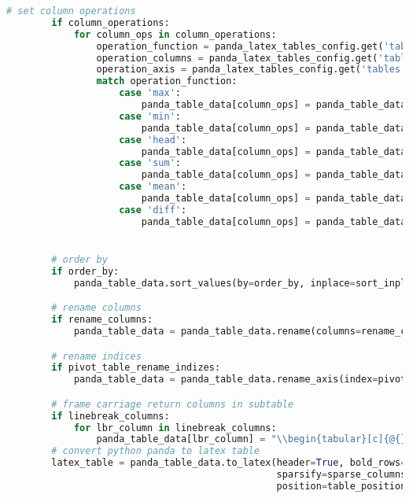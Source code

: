\begin{lstlisting}[language=python, caption=Python LaTex - pandas\_dataframe\_to\_latex\_table.py CSV - LaTex Tabelle,captionpos=b,label={lst:Python LaTex - pandas_dataframe_to_latex_table},breaklines=true]
        # set column operations
        if column_operations:
            for column_ops in column_operations:
                operation_function = panda_latex_tables_config.get('tables').get(table_item).get('column_operations').get('operations').get(column_ops).get('operation_function')
                operation_columns = panda_latex_tables_config.get('tables').get(table_item).get('column_operations').get('operations').get(column_ops).get('columns')
                operation_axis = panda_latex_tables_config.get('tables').get(table_item).get('column_operations').get('operations').get(column_ops).get('axis_number')
                match operation_function:
                    case 'max':
                        panda_table_data[column_ops] = panda_table_data[operation_columns].max()
                    case 'min':
                        panda_table_data[column_ops] = panda_table_data[operation_columns].min()
                    case 'head':
                        panda_table_data[column_ops] = panda_table_data[operation_columns].head()
                    case 'sum':
                        panda_table_data[column_ops] = panda_table_data[operation_columns].sum(axis=operation_axis)
                    case 'mean':
                        panda_table_data[column_ops] = panda_table_data[operation_columns].mean()
                    case 'diff':
                        panda_table_data[column_ops] = panda_table_data[operation_columns[1]] - panda_table_data[operation_columns[0]]


        # order by
        if order_by:
            panda_table_data.sort_values(by=order_by, inplace=sort_inplace, ascending=sort_acending)

        # rename columns
        if rename_columns:
            panda_table_data = panda_table_data.rename(columns=rename_columns)

        # rename indices
        if pivot_table_rename_indizes:
            panda_table_data = panda_table_data.rename_axis(index=pivot_table_rename_indizes)

        # frame carriage return columns in subtable
        if linebreak_columns:
            for lbr_column in linebreak_columns:
                panda_table_data[lbr_column] = "\\begin{tabular}[c]{@{}l@{}}" + panda_table_data[lbr_column].astype(str) + "\\end{tabular}"
        # convert python panda to latex table
        latex_table = panda_table_data.to_latex(header=True, bold_rows=False, longtable=longtable,
                                                sparsify=sparse_columns, label=table_label, caption=table_caption,
                                                position=table_position, na_rep='', index=pivot_table_indizes_visible)


\end{lstlisting}
